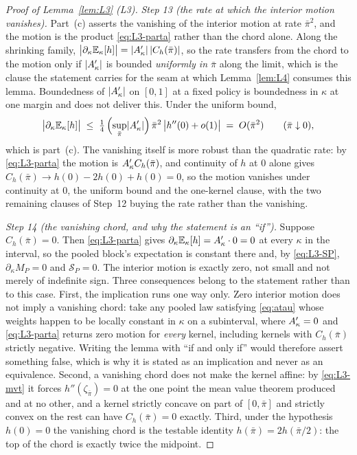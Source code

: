 \begin{proof}[Proof of Lemma~\ref{lem:L3} (L3)]
\emph{Step 13 (the rate at which the interior motion vanishes).} Part~(c) asserts the vanishing of
the interior motion at rate $\bar\pi^2$, and the motion is the product \eqref{eq:L3-parta} rather
than the chord alone. Along the shrinking family,
$\bigl|\partial_\kappa\mathbb{E}_\kappa[h]\bigr| = \lvert A'_{\kappa}\rvert\,\lvert C_h(\bar\pi)\rvert$, so the
rate transfers from the chord to the motion only if $\lvert A'_{\kappa}\rvert$ is bounded \emph{uniformly in
$\bar\pi$} along the limit, which is the clause the statement carries for the seam at which
Lemma~\ref{lem:L4} consumes this lemma. Boundedness of $\lvert A'_{\kappa}\rvert$ on $[0,1]$ at a fixed
policy is boundedness in $\kappa$ at one margin and does not deliver this. Under the uniform bound,
\begin{equation}
\label{eq:L3-rate}
\bigl|\partial_\kappa\mathbb{E}_\kappa[h]\bigr|
 \;\le\; \tfrac14\,\Bigl(\sup_{\bar\pi}\lvert A'_{\kappa}\rvert\Bigr)\,\bar\pi^2\,
   \bigl|h''(0)+o(1)\bigr| \;=\; O(\bar\pi^2)
 \qquad (\bar\pi \downarrow 0),
\end{equation}
which is part~(c). The vanishing itself is more robust than the quadratic rate: by
\eqref{eq:L3-parta} the motion is $A'_{\kappa} C_h(\bar\pi)$, and continuity of $h$ at $0$ alone gives
$C_h(\bar\pi) \to h(0)-2h(0)+h(0) = 0$, so the motion vanishes under continuity at $0$, the uniform
bound and the one-kernel clause, with the two remaining clauses of Step~12 buying the rate rather
than the vanishing.

\emph{Step 14 (the vanishing chord, and why the statement is an ``if'').} Suppose
$C_h(\bar\pi) = 0$. Then \eqref{eq:L3-parta} gives $\partial_\kappa\mathbb{E}_\kappa[h] = A'_{\kappa}\cdot 0 = 0$
at every $\kappa$ in the interval, so the pooled block's expectation is constant there and, by
\eqref{eq:L3-SP}, $\partial_\kappa M_P = 0$ and $\mathcal S_P = 0$. The interior motion is exactly
zero, not small and not merely of indefinite sign. Three consequences belong to the statement rather
than to this case. First, the implication runs one way only. Zero interior motion does not imply a
vanishing chord: take any pooled law satisfying \eqref{eq:atau} whose weights happen to be locally
constant in $\kappa$ on a subinterval, where $A'_{\kappa} = 0$ and \eqref{eq:L3-parta} returns zero motion
for \emph{every} kernel, including kernels with $C_h(\bar\pi)$ strictly negative. Writing the lemma
with ``if and only if'' would therefore assert something false, which is why it is stated as an
implication and never as an equivalence. Second, a vanishing chord does not make the kernel affine:
by \eqref{eq:L3-mvt} it forces $h''(\zeta_{\bar\pi}) = 0$ at the one point the mean value theorem
produced and at no other, and a kernel strictly concave on part of $[0,\bar\pi]$ and strictly convex
on the rest can have $C_h(\bar\pi) = 0$ exactly. Third, under the hypothesis $h(0)=0$ the vanishing
chord is the testable identity $h(\bar\pi) = 2h(\bar\pi/2)$: the top of the chord is exactly twice
the midpoint.


\end{proof}
